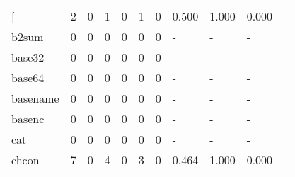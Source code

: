 \begin{longtable}{lp{1.10cm}p{1.10cm}p{1.10cm}p{1.10cm}p{1.10cm}p{1.10cm}p{1.10cm}p{1.10cm}p{1.10cm}p{1.10cm}}
\bottomrule
\endlastfoot
{[}         &                      2 &                                  0 &                                 1 &                                0 &                                 1 &                               0 &                          0.500 &                                 1.000 &                               0.000 \\
b2sum     &                      0 &                                  0 &                                 0 &                                0 &                                 0 &                               0 &                              - &                                     - &                                   - \\
base32    &                      0 &                                  0 &                                 0 &                                0 &                                 0 &                               0 &                              - &                                     - &                                   - \\
base64    &                      0 &                                  0 &                                 0 &                                0 &                                 0 &                               0 &                              - &                                     - &                                   - \\
basename  &                      0 &                                  0 &                                 0 &                                0 &                                 0 &                               0 &                              - &                                     - &                                   - \\
basenc    &                      0 &                                  0 &                                 0 &                                0 &                                 0 &                               0 &                              - &                                     - &                                   - \\
cat       &                      0 &                                  0 &                                 0 &                                0 &                                 0 &                               0 &                              - &                                     - &                                   - \\
chcon     &                      7 &                                  0 &                                 4 &                                0 &                                 3 &                               0 &                          0.464 &                                 1.000 &                               0.000 \\

\end{longtable}
